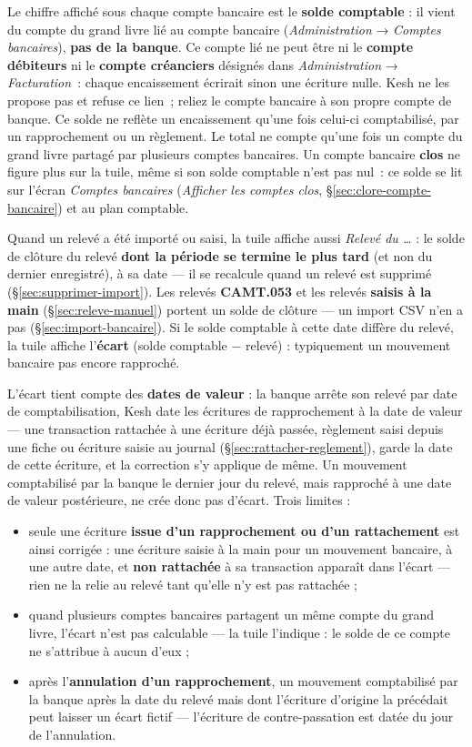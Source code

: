 \documentclass[a4paper,11pt,oneside]{article}
\begin{document}
Le chiffre affiché sous chaque compte bancaire est le \textbf{solde comptable} : il vient
du compte du grand livre lié au compte bancaire (\emph{Administration} → \emph{Comptes
bancaires}), \textbf{pas de la banque}. Ce compte lié ne peut être ni le \textbf{compte
débiteurs} ni le \textbf{compte créanciers} désignés dans \emph{Administration} →
\emph{Facturation}~: chaque encaissement écrirait sinon une écriture nulle. Kesh ne les
propose pas et refuse ce lien~; reliez le compte bancaire à son propre compte de banque.
Ce solde ne reflète un encaissement qu'une fois celui-ci comptabilisé, par un rapprochement
ou un règlement. Le total ne compte qu'une fois un
compte du grand livre partagé par plusieurs comptes bancaires. Un compte bancaire
\textbf{clos} ne figure plus sur la tuile, même si son solde comptable n'est pas nul~: ce solde
se lit sur l'écran \emph{Comptes bancaires} (\emph{Afficher les comptes clos},
\S\ref{sec:clore-compte-bancaire}) et au plan comptable.

Quand un relevé a été importé ou saisi, la tuile affiche aussi \emph{Relevé du \dots} : le solde de
clôture du relevé \textbf{dont la période se termine le plus tard} (et non du dernier enregistré), à sa
date --- il se recalcule quand un relevé est supprimé (\S\ref{sec:supprimer-import}). Les relevés \textbf{CAMT.053}
et les relevés \textbf{saisis à la main} (\S\ref{sec:releve-manuel}) portent un solde de clôture — un import CSV n'en a pas (\S\ref{sec:import-bancaire}). Si
le solde comptable à cette date diffère du relevé, la tuile affiche l'\textbf{écart}
(solde comptable − relevé) : typiquement un mouvement bancaire pas encore rapproché.

L'écart tient compte des \textbf{dates de valeur} : la banque arrête son relevé par date de
comptabilisation, Kesh date les écritures de rapprochement à la date de valeur --- une
transaction rattachée à une écriture déjà passée, règlement saisi depuis une fiche ou
écriture saisie au journal (\S\ref{sec:rattacher-reglement}), garde la date de cette écriture,
et la correction s'y applique de même. Un
mouvement comptabilisé par la banque le dernier jour du relevé, mais rapproché à une date
de valeur postérieure, ne crée donc pas d'écart. Trois limites :
\begin{itemize}
    \item seule une écriture \textbf{issue d'un rapprochement ou d'un rattachement} est ainsi corrigée : une
    écriture saisie à la main pour un mouvement bancaire, à une autre date, et \textbf{non
    rattachée} à sa transaction apparaît dans l'écart --- rien ne la relie au relevé tant
    qu'elle n'y est pas rattachée ;
    \item quand plusieurs comptes bancaires partagent un même compte du grand livre,
    l'écart n'est pas calculable — la tuile l'indique : le solde de ce compte ne
    s'attribue à aucun d'eux ;
    \item après l'\textbf{annulation d'un rapprochement}, un mouvement comptabilisé par la
    banque après la date du relevé mais dont l'écriture d'origine la précédait peut laisser
    un écart fictif — l'écriture de contre-passation est datée du jour de l'annulation.
\end{itemize}
\end{document}
